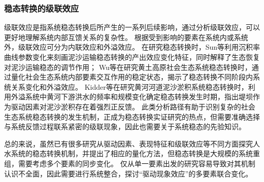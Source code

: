\subsubsection{稳态转换的级联效应}

级联效应是指系统稳态转换后所产生的一系列后续影响，通过分析级联效应，可以更好地理解系统内部互馈关系的复杂性\cite{rocha2018}。
根据受到影响的要素在系统内或系统外，级联效应可分为内联效应和外溢效应\cite{rocha2018}。
在研究稳态转换时，Sun等利用沉积率曲线参数变化来刻画泥沙运输稳态转换的产出效应变化特征，同时解释了生态恢复对泥沙运输稳态的调节作用\cite{sun2020}；
Wu等在研究黄土高原社会\textendash{}生态系统稳态转换时，通过量化社会\textendash{}生态系统内部要素交互作用的稳定状态，揭示了稳态转换不同阶段内系统关系变化和外溢效应\cite{wu2020a}。
Kidder等在研究黄河河道泥沙淤积系统稳态转换时，利用外溢系统中黄河下游洪水的频率和规模变化确定稳态转换发生时期，指出堤坝作为驱动因素对泥沙淤积存在着强烈正反馈\cite{kidder2015}。
此类分析路径有助于识别复杂的社会\textendash{}生态系统稳态转换的发生机制，正成为稳态转换实证研究的热点，但需要准确选择与系统反馈过程联系紧密的级联现象，因此也需要关于系统稳态的先验知识。

总的来说，虽然已有很多研究从驱动因素、表现特征和级联效应等不同方面探究人\textendash{}水系统的稳态转换机制，并提出了相应的量化方法，但稳态转换是大规模的系统重组，需要考虑多个要素的同步变化。
仅从单一要素出发的研究容易导致对其机制认识不全面，因此需要进行系统整合，探讨“驱动\textendash{}现象\textendash{}效应”的多要素联合变化。
